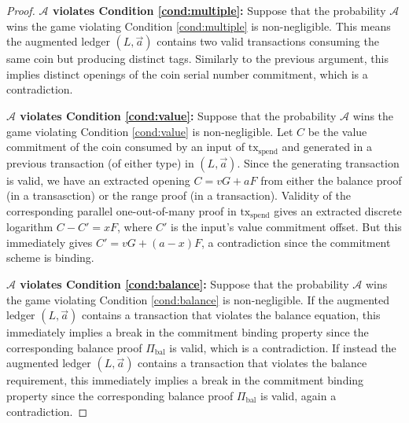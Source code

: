 \documentclass{llncs}
\begin{document}
\begin{proof}
\textbf{$\mathcal{A}$ violates Condition \ref{cond:multiple}:} Suppose that the probability $\mathcal{A}$ wins the game violating Condition \ref{cond:multiple} is non-negligible.
This means the augmented ledger $(L, \vec{a})$ contains two valid  transactions consuming the same coin but producing distinct tags.
Similarly to the previous argument, this implies distinct openings of the coin serial number commitment, which is a contradiction.

\textbf{$\mathcal{A}$ violates Condition \ref{cond:value}:} Suppose that the probability $\mathcal{A}$ wins the game violating Condition \ref{cond:value} is non-negligible.
Let $C$ be the value commitment of the coin consumed by an input of $\text{tx}_{\text{spend}}$ and generated in a previous transaction (of either type) in $(L, \vec{a})$.
Since the generating transaction is valid, we have an extracted opening $C = vG + aF$ from either the balance proof (in a  transasction) or the range proof (in a  transaction).
Validity of the corresponding parallel one-out-of-many proof in $\text{tx}_{\text{spend}}$ gives an extracted discrete logarithm $C - C' = xF$, where $C'$ is the input's value commitment offset.
But this immediately gives $C' = vG + (a - x)F$, a contradiction since the commitment scheme is binding.

\textbf{$\mathcal{A}$ violates Condition \ref{cond:balance}:} Suppose that the probability $\mathcal{A}$ wins the game violating Condition \ref{cond:balance} is non-negligible.
If the augmented ledger $(L, \vec{a})$ contains a  transaction that violates the balance equation, this immediately implies a break in the commitment binding property since the corresponding balance proof $\Pi_{\text{bal}}$ is valid, which is a contradiction.
If instead the augmented ledger $(L, \vec{a})$ contains a  transaction that violates the balance requirement, this immediately implies a break in the commitment binding property since the corresponding balance proof $\Pi_{\text{bal}}$ is valid, again a contradiction.


\end{proof}
\end{document}
